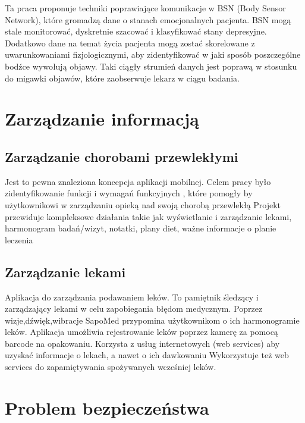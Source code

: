 Ta praca proponuje techniki poprawiające komunikacje w BSN (Body Sensor Network), które gromadzą dane o stanach emocjonalnych pacjenta. BSN  mogą stale monitorować, dyskretnie szacować i klasyfikować stany depresyjne. Dodatkowo dane na temat życia pacjenta mogą zostać skorelowane z uwarunkowaniami fizjologicznymi, aby zidentyfikować w jaki sposób poszczególne bodźce wywołują objawy. Taki ciągły strumień danych jest poprawą w stosunku do migawki objawów, które zaobserwuje lekarz w ciągu badania. 
 


\section{Zarządzanie informacją}
\label{sec:zarzadz_inf}

\subsection{Zarządzanie chorobami przewlekłymi}
Jest to pewna znaleziona koncepcja aplikacji mobilnej. Celem pracy było zidentyfikowanie funkcji i wymagań funkcyjnych , które pomogły by użytkownikowi w zarządzaniu opieką nad swoją chorobą przewlekłą
 Projekt przewiduje kompleksowe działania takie jak wyświetlanie i zarządzanie lekami, harmonogram badań/wizyt, notatki, plany diet, ważne informacje o planie leczenia

\subsection{Zarządzanie lekami}
 Aplikacja do zarządzania podawaniem leków. To pamiętnik śledzący i zarządzający lekami w celu zapobiegania błędom medycznym. 
 Poprzez wizje,dźwięk,wibracje  SapoMed przypomina użytkownikom o ich harmonogramie leków.
 Aplikacja umożliwia rejestrowanie leków poprzez kamerę za pomocą barcode na opakowaniu. 
 Korzysta z usług internetowych (web services) aby uzyskać informacje o lekach, a nawet o ich dawkowaniu
 Wykorzystuje też web services do zapamiętywania spożywanych wcześniej leków.

\section{Problem bezpieczeństwa}
\label{sec:problem_bezp}